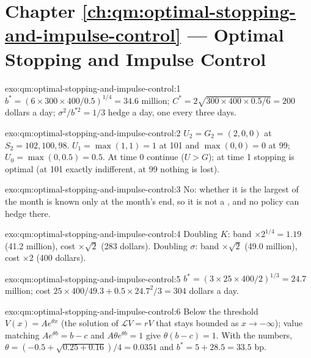 \section*{Chapter \ref{ch:qm:optimal-stopping-and-impulse-control} --- Optimal Stopping and Impulse Control}

\begin{solution}{exo:qm:optimal-stopping-and-impulse-control:1}
$b^* = (6 \times 300 \times 400/0.5)^{1/4} = 34.6$ million; $C^* = 2\sqrt{300 \times 400 \times 0.5/6} = 200$ dollars a day; $\sigma^2/b^{*2} = 1/3$ hedge
a day, one every three days.
\end{solution}

\begin{solution}{exo:qm:optimal-stopping-and-impulse-control:2}
$U_2 = G_2 = (2, 0, 0)$ at $S_2 = 102, 100, 98$. $U_1 = \max(1, 1) = 1$ at 101 and $\max(0, 0) = 0$ at 99; $U_0 = \max(0, 0.5) = 0.5$. At time 0
continue ($U > G$); at time 1 stopping is optimal (at 101 exactly indifferent, at 99 nothing is lost).
\end{solution}

\begin{solution}{exo:qm:optimal-stopping-and-impulse-control:3}
No: whether it is the largest of the month is known only at the month's end, so it is not a , and no policy can hedge
there.
\end{solution}

\begin{solution}{exo:qm:optimal-stopping-and-impulse-control:4}
Doubling $K$: band $\times 2^{1/4} = 1.19$ (41.2 million), cost $\times\sqrt2$ (283 dollars). Doubling $\sigma$: band $\times\sqrt2$ (49.0 million), cost $\times 2$
(400 dollars).
\end{solution}

\begin{solution}{exo:qm:optimal-stopping-and-impulse-control:5}
$b^* = (3 \times 25 \times 400/2)^{1/3} = 24.7$ million; cost $25 \times 400/49.3 + 0.5 \times 24.7^2/3 = 304$ dollars a day.
\end{solution}

\begin{solution}{exo:qm:optimal-stopping-and-impulse-control:6}
Below the threshold $V(x) = Ae^{\theta x}$ (the solution of $\mathcal LV = rV$ that stays bounded as $x \to -\infty$); value matching $Ae^{\theta b} = b - c$ and
 $A\theta e^{\theta b} = 1$ give $\theta(b - c) = 1$. With the numbers, $\theta = (-0.5 + \sqrt{0.25 + 0.16})/4 = 0.0351$ and $b^* = 5 + 28.5 =
33.5$ bp.
\end{solution}

